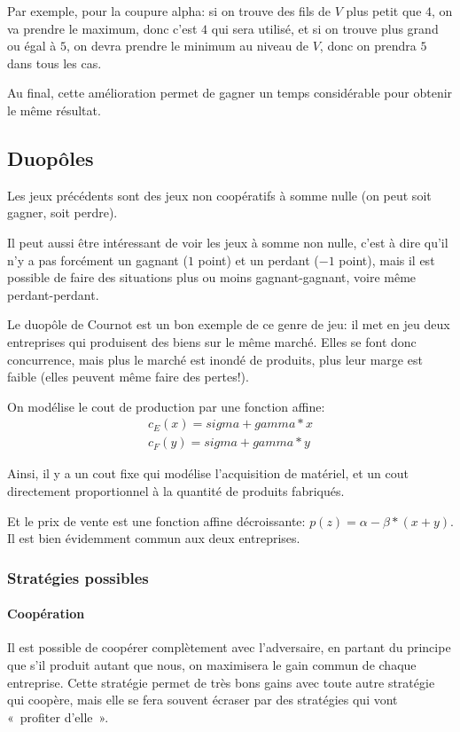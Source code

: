 Par exemple, pour la coupure alpha: si on trouve des fils de $V$ plus petit
que $4$, on va prendre le maximum, donc c'est $4$ qui sera utilisé, et si on
trouve plus grand ou égal à $5$, on devra prendre le minimum au niveau de $V$,
donc on prendra $5$ dans tous les cas.

Au final, cette amélioration permet de gagner un temps considérable pour
obtenir le même résultat.

\subsection{Duopôles}
  Les jeux précédents sont des jeux non coopératifs à somme nulle (on peut soit
  gagner, soit perdre).

  Il peut aussi être intéressant de voir les jeux à somme non nulle, c'est à
  dire qu'il n'y a pas forcément un gagnant ($1$ point) et un perdant ($-1$
  point), mais il est possible de faire des situations plus ou moins
  gagnant-gagnant, voire même perdant-perdant.

  Le duopôle de Cournot est un bon exemple de ce genre de jeu: il met en jeu
  deux entreprises qui produisent des biens sur le même marché. Elles se font
  donc concurrence, mais plus le marché est inondé de produits, plus leur marge
  est faible (elles peuvent même faire des pertes!).

  On modélise le cout de production par une fonction affine:
  \[\begin{array}{l}
    c_E(x) = sigma + gamma*x \\
    c_F(y) = sigma + gamma*y
  \end{array}\]

  Ainsi, il y a un cout fixe qui modélise l'acquisition de matériel, et un cout
  directement proportionnel à la quantité de produits fabriqués.

  Et le prix de vente est une fonction affine décroissante:
    $p(z) = \alpha - \beta*(x + y)$.
  Il est bien évidemment commun aux deux entreprises.

  \subsubsection{Stratégies possibles}

    \paragraph{Coopération} Il est possible de coopérer complètement avec
      l'adversaire, en partant du principe que s'il produit autant que nous,
      on maximisera le gain commun de chaque entreprise.
      Cette stratégie permet de très bons gains avec toute autre stratégie qui
      coopère, mais elle se fera souvent écraser par des stratégies qui vont
      «~profiter d'elle~».

